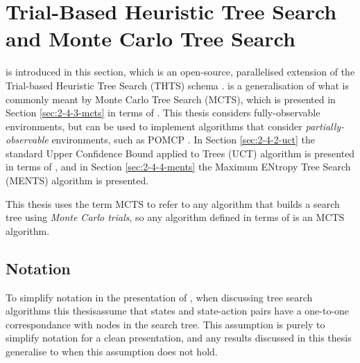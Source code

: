 

        














\section{Trial-Based Heuristic Tree Search and Monte Carlo Tree Search}
\label{sec:2-4-thts}

    \thtspp\ewe \cite{thtspp} is introduced in this section, which is an open-source, parallelised extension of the  Trial-based Heuristic Tree Search (THTS) schema \cite{thts}. \thtspp\ewe is a generalisation of what is commonly meant by Monte Carlo Tree Search (MCTS), which is presented in Section \ref{sec:2-4-3-mcts} in terms of \thtspp. This thesis considers fully-observable environments, but \thtspp\ewe can be used to implement algorithms that consider \textit{partially-observable} environments, such as POMCP . In Section \ref{sec:2-4-2-uct} the standard Upper Confidence Bound applied to Trees (UCT) algorithm is presented in terms of \thtspp\ewe, and in Section \ref{sec:2-4-4-ments} the Maximum ENtropy Tree Search (MENTS) algorithm is presented.


    This thesis uses the term MCTS to refer to any algorithm that builds a search tree using \textit{Monte Carlo trials}, so any algorithm defined in terms of \thtspp\ewe is an MCTS algorithm. 




    \subsection{Notation}
    \label{sec:2-4-0-notation}
        To simplify notation in the presentation of \thtspp, when discussing tree search algorithms this thesisassume that states and state-action pairs have a one-to-one correspondance with nodes in the search tree. This assumption is purely to simplify notation for a clean presentation, and any results discussed in this thesis generalise to when this assumption does not hold. 

